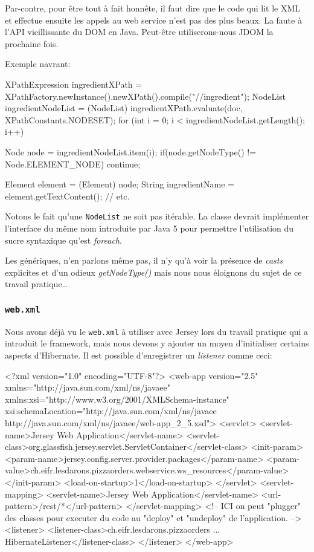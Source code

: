 Par-contre, pour être tout à fait honnête, il faut dire que le code qui lit le XML et effectue
ensuite les appels au web service n'est pas des plus beaux. La faute à l'API vieillissante du DOM en Java.
Peut-être utiliserons-nous JDOM la prochaine fois.

Exemple navrant:

\begin{javacode}
XPathExpression ingredientXPath = XPathFactory.newInstance().newXPath().compile("//ingredient");
NodeList ingredientNodeList = (NodeList) ingredientXPath.evaluate(doc, XPathConstants.NODESET);
for (int i = 0; i < ingredientNodeList.getLength(); i++) {
    Node node = ingredientNodeList.item(i);
    if(node.getNodeType() != Node.ELEMENT_NODE) continue;

    Element element = (Element) node;
    String ingredientName = element.getTextContent();
    // etc.
}
\end{javacode}

Notons le fait qu'une \verb|NodeList| ne soit pas itérable. La classe devrait implémenter l'interface du même nom
introduite par Java 5 pour permettre l'utilisation du sucre syntaxique qu'est \emph{foreach}.

Les génériques, n'en parlons même pas, il n'y qu'à voir la présence de \emph{casts} explicites et 
d'un odieux \emph{getNodeType()} mais nous nous éloignons du sujet de ce travail pratique\dots

\cprotect\subsubsection{\verb|web.xml|}

Nous avons déjà vu le \verb|web.xml| à utiliser avec Jersey lors du travail pratique qui a introduit le framework, 
mais nous devons y ajouter
un moyen d'initialiser certains aspects d'Hibernate. Il est possible d'enregistrer
un \emph{listener} comme ceci:

\begin{xmlcode}
<?xml version="1.0" encoding="UTF-8"?>
<web-app version="2.5" xmlns="http://java.sun.com/xml/ns/javaee" 
                       xmlns:xsi="http://www.w3.org/2001/XMLSchema-instance" 
                       xsi:schemaLocation="http://java.sun.com/xml/ns/javaee 
                                           http://java.sun.com/xml/ns/javaee/web-app_2_5.xsd">
    <servlet>
        <servlet-name>Jersey Web Application</servlet-name>
        <servlet-class>org.glassfish.jersey.servlet.ServletContainer</servlet-class>
        <init-param>
            <param-name>jersey.config.server.provider.packages</param-name>
            <param-value>ch.eifr.lesdarons.pizzaorders.webservice.ws_resources</param-value>
        </init-param>
        <load-on-startup>1</load-on-startup>
    </servlet>
    <servlet-mapping>
        <servlet-name>Jersey Web Application</servlet-name>
        <url-pattern>/rest/*</url-pattern>
    </servlet-mapping>
    <!-- ICI on peut "plugger" des classes pour executer du code au "deploy" et "undeploy"
         de l'application. -->
    <listener>
        <listener-class>ch.eifr.lesdarons.pizzaorders ... HibernateListener</listener-class>
    </listener>
</web-app>
\end{xmlcode}

